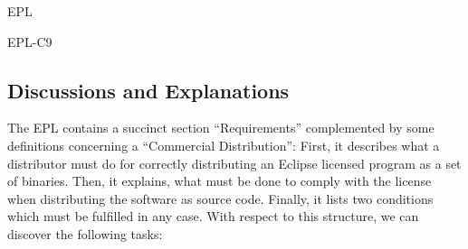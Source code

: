 \begin{license}{EPL}
\begin{lsuc}{EPL-C9}


  \begin{lsucrequires}
    \lsucmandatory{\keepLicensingElements\ \addWhenCompiling}
    \lsucmandatory{\describeModifications}
    \lsucmandatory{\markAllModifications}
    \lsucmandatory{\linkToRepo}
    \lsucmandatory{\organizeYourModifications}
    \lsucoptional{\addToYourCopyrightNotice}
  \end{lsucrequires}

  \begin{lsucprohibits}
    \lsucitem{\dontChangeCopyrightNotices}
    \lsucitem{\noPatentLitigation}
  \end{lsucprohibits}

\end{lsuc}

\subsection{Discussions and Explanations}
\label{EPLDiscussion}

The EPL contains a succinct section \enquote{Requirements}
complemented by some definitions concerning a \enquote{Commercial
Distribution}: First, it describes what a distributor must do for
correctly distributing an Eclipse licensed program as a set of binaries. Then,
it explains, what must be done to comply with the license when distributing the
software as source code.  Finally, it lists two conditions which must be
fulfilled in any case.  
With respect to this structure, we can discover the following tasks:

\begin{itemize}


\end{itemize}
\end{license}
